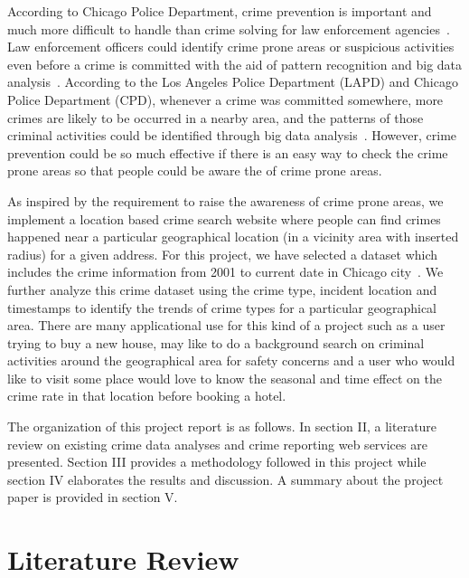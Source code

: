 According to Chicago Police Department, crime prevention is important
and much more difficult to handle than crime solving for law
enforcement agencies~\cite{hid-sp18-409-www-cpd}. Law enforcement
officers could identify crime prone areas or suspicious activities
even before a crime is committed with the aid of pattern recognition
and big data analysis~\cite{hid-sp18-409-nath2006crime,
hid-sp18-409-gera2014city}.  According to the Los Angeles Police
Department (LAPD) and Chicago Police Department (CPD), whenever a
crime was committed somewhere, more crimes are likely to be occurred
in a nearby area, and the patterns of those criminal activities could
be identified through big data analysis~\cite{hid-sp18-409-www-cpd,
hid-sp18-409-www-lapd}. However, crime prevention could be so much
effective if there is an easy way to check the crime prone areas so
that people could be aware the of crime prone areas.

As inspired by the requirement to raise the awareness of crime prone
areas, we implement a location based crime search website where people
can find crimes happened near a particular geographical location (in a
vicinity area with inserted radius) for a given address. For this
project, we have selected a dataset which includes the crime
information from 2001 to current date in Chicago
city~\cite{hid-sp18-409-www-data.gov}. We further analyze this crime
dataset using the crime type, incident location and timestamps to
identify the trends of crime types for a particular geographical
area. There are many applicational use for this kind of a project such
as a user trying to buy a new house, may like to do a background
search on criminal activities around the geographical area for safety
concerns and a user who would like to visit some place would love to
know the seasonal and time effect on the crime rate in that location
before booking a hotel.

The organization of this project report is as follows. In section II,
a literature review on existing crime data analyses and crime
reporting web services are presented. Section III provides a
methodology followed in this project while section IV elaborates the
results and discussion. A summary about the project paper is provided
in section V.

\section{Literature Review}

